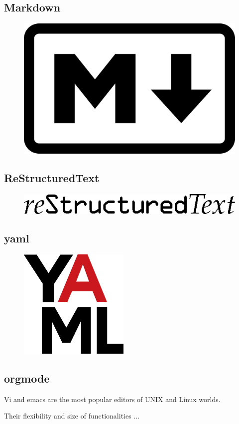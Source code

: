 \subsection{Markdown}
\lipsum[1]
\begin{figure}
	\includegraphics[width=0.19\paperwidth]{./img/markup/markdown}
\end{figure}
\lipsum[1]

\subsection{ReStructuredText}
\lipsum[1]
\begin{figure}
	\includegraphics[width=0.19\paperwidth]{./img/markup/ReStructuredText}
\end{figure}
\lipsum[1]

\subsection{yaml}
\lipsum[1]
\begin{figure}
	\includegraphics[width=0.19\paperwidth]{./img/markup/yaml}
\end{figure}
\lipsum[1]

\subsection{orgmode}
Vi and emacs are the most popular editors of UNIX and Linux worlds.

Their flexibility and size of functionalities ...
\lipsum[1]
\begin{figure}
	
\end{figure}
\lipsum[1]